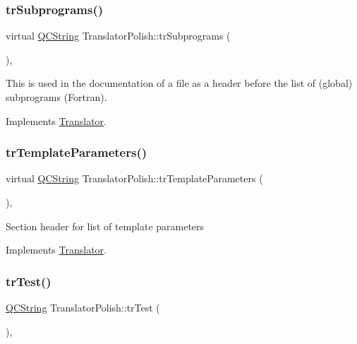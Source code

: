 \subsubsection{\texorpdfstring{trSubprograms()}{trSubprograms()}}
{\footnotesize\ttfamily virtual \mbox{\hyperlink{class_q_c_string}{Q\+C\+String}} Translator\+Polish\+::tr\+Subprograms (\begin{DoxyParamCaption}{ }\end{DoxyParamCaption})\hspace{0.3cm}{\ttfamily [inline]}, {\ttfamily [virtual]}}

This is used in the documentation of a file as a header before the list of (global) subprograms (Fortran). 

Implements \mbox{\hyperlink{class_translator}{Translator}}.

\mbox{\label{class_translator_polish_a662e8766ea79fbb038bea786067d121c}} 
\subsubsection{\texorpdfstring{trTemplateParameters()}{trTemplateParameters()}}
{\footnotesize\ttfamily virtual \mbox{\hyperlink{class_q_c_string}{Q\+C\+String}} Translator\+Polish\+::tr\+Template\+Parameters (\begin{DoxyParamCaption}{ }\end{DoxyParamCaption})\hspace{0.3cm}{\ttfamily [inline]}, {\ttfamily [virtual]}}

Section header for list of template parameters 

Implements \mbox{\hyperlink{class_translator}{Translator}}.

\mbox{\label{class_translator_polish_aad254fed5e66326eb597796325207be8}} 
\subsubsection{\texorpdfstring{trTest()}{trTest()}}
{\footnotesize\ttfamily \mbox{\hyperlink{class_q_c_string}{Q\+C\+String}} Translator\+Polish\+::tr\+Test (\begin{DoxyParamCaption}{ }\end{DoxyParamCaption})\hspace{0.3cm}{\ttfamily [inline]}, {\ttfamily [virtual]}}

